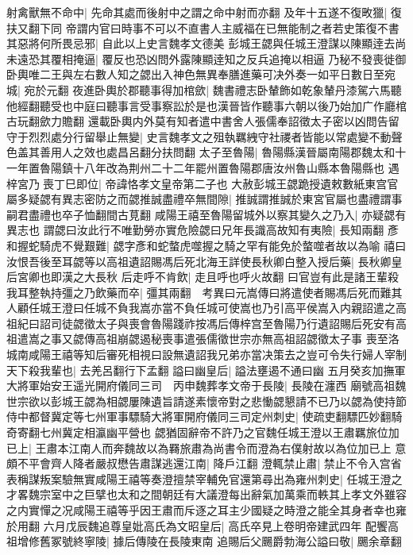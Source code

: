 射禽獸無不命中|{
	先命其處而後射中之謂之命中射而亦翻}
及年十五遂不復畋獵|{
	復扶又翻下同}
帝謂内官曰時事不可以不直書人主威福在已無能制之者若史策復不書其惡將何所畏忌邪|{
	自此以上史言魏孝文德美}
彭城王勰與任城王澄謀以陳顯逹去尚未遠恐其覆相掩逼|{
	覆反也恐凶問外露陳顯逹知之反兵追掩以相逼}
乃秘不發喪徙御卧輿唯二王與左右數人知之勰出入神色無異奉膳進藥可决外奏一如平日數日至宛城|{
	宛於元翻}
夜進卧輿於郡聽事得加棺歛|{
	魏書禮志卧輦飾如乾象輦丹漆駕六馬聽他經翻聽受也中庭曰聽事言受事察訟於是也漢晉皆作聽事六朝以後乃始加广作廳棺古玩翻歛力贍翻}
還載卧輿内外莫有知者遣中書舍人張儒奉詔徵太子密以凶問告留守于烈烈處分行留舉止無變|{
	史言魏孝文之殂執羈絏守社禝者皆能以常處變不動聲色盖其善用人之效也處昌呂翻分扶問翻}
太子至魯陽|{
	魯陽縣漢晉屬南陽郡魏太和十一年置魯陽鎮十八年改為荆州二十二年罷州置魯陽郡唐汝州魯山縣本魯陽縣也}
遇梓宮乃喪丁巳即位|{
	帝諱恪孝文皇帝第二子也}
大赦彭城王勰跪授遺敕數紙東宫官屬多疑勰有異志密防之而勰推誠盡禮卒無間隙|{
	推誠謂推誠於東宮官屬也盡禮謂事嗣君盡禮也卒子恤翻間古莧翻}
咸陽王禧至魯陽留城外以察其變久之乃入|{
	亦疑勰有異志也}
謂勰曰汝此行不唯勤勞亦實危險勰曰兄年長識高故知有夷險|{
	長知兩翻}
彥和握蛇騎虎不覺艱難|{
	勰字彥和蛇螫虎噬握之騎之罕有能免於螫噬者故以為喻}
禧曰汝恨吾後至耳勰等以高祖遺詔賜馮后死北海王詳使長秋卿白整入授后藥|{
	長秋卿皇后宮卿也即漢之大長秋}
后走呼不肯飲|{
	走且呼也呼火故翻}
曰官豈有此是諸王輩殺我耳整執持彊之乃飲藥而卒|{
	彊其兩翻　考異曰元嵩傳曰將遣使者賜馮后死而難其人顧任城王澄曰任城不負我嵩亦當不負任城可使嵩也乃引高平侯嵩入内親詔遣之高祖紀曰詔司徒勰徵太子與喪會魯陽踐祚按馮后傳梓宫至魯陽乃行遺詔賜后死安有高祖遣嵩之事又勰傳高祖崩勰遏秘喪事遣張儒徵世宗亦無高祖詔勰徵太子事}
喪至洛城南咸陽王禧等知后審死相視曰設無遺詔我兄弟亦當决策去之豈可令失行婦人宰制天下殺我輩也|{
	去羌呂翻行下孟翻}
謚曰幽皇后|{
	謚法壅遏不通曰幽}
五月癸亥加撫軍大將軍始安王遥光開府儀同三司　丙申魏葬孝文帝于長陵|{
	長陵在瀍西}
廟號高祖魏世宗欲以彭城王勰為相勰屢陳遺旨請遂素懷帝對之悲慟勰懇請不已乃以勰為使持節侍中都督冀定等七州軍事驃騎大將軍開府儀同三司定州刺史|{
	使疏吏翻驃匹妙翻騎奇寄翻七州冀定相瀛幽平營也}
勰猶固辭帝不許乃之官魏任城王澄以王肅羈旅位加已上|{
	王肅本江南人而奔魏故以為羇旅肅為尚書令而澄為右僕射故以為位加已上}
意頗不平會齊人降者嚴叔懋告肅謀逃還江南|{
	降戶江翻}
澄輒禁止肅|{
	禁止不令入宫省}
表稱謀叛案驗無實咸陽王禧等奏澄擅禁宰輔免官還第尋出為雍州刺史|{
	任城王澄之才畧魏宗室中之巨擘也太和之間朝廷有大議澄每出辭氣加萬乘而軼其上孝文外雖容之内實憚之况咸陽王禧等乎因王肅而斥逐之耳主少國疑之時澄之能全其身者幸也雍於用翻}
六月戊辰魏追尊皇妣高氏為文昭皇后|{
	高氏卒見上卷明帝建武四年}
配饗高祖增修舊冢號終寧陵|{
	據后傳陵在長陵東南}
追賜后父颺爵勃海公謚曰敬|{
	颺余章翻}

